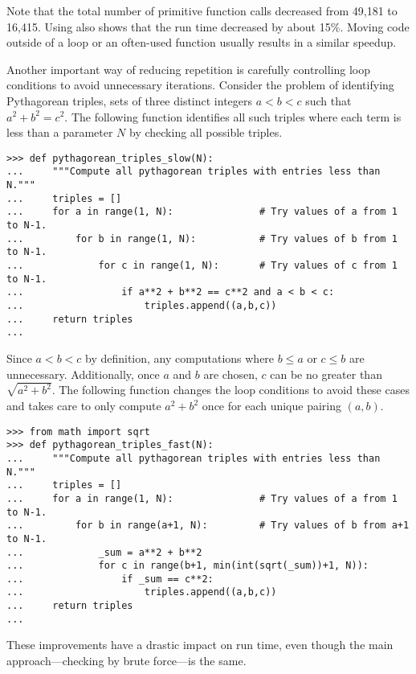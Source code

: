 Note that the total number of primitive function calls decreased from 49,181 to 16,415.
Using  also shows that the run time decreased by about 15\%.
Moving code outside of a loop or an often-used function usually results in a similar speedup.

Another important way of reducing repetition is carefully controlling loop conditions to avoid unnecessary iterations.
Consider the problem of identifying Pythagorean triples, sets of three distinct integers $a < b < c$ such that $a^2 + b^2 = c^2$.
The following function identifies all such triples where each term is less than a parameter $N$ by checking all possible triples.

\begin{lstlisting}
>>> def pythagorean_triples_slow(N):
...     """Compute all pythagorean triples with entries less than N."""
...     triples = []
...     for a in range(1, N):               # Try values of a from 1 to N-1.
...         for b in range(1, N):           # Try values of b from 1 to N-1.
...             for c in range(1, N):       # Try values of c from 1 to N-1.
...                 if a**2 + b**2 == c**2 and a < b < c:
...                     triples.append((a,b,c))
...     return triples
...
\end{lstlisting}

Since $a < b < c$ by definition, any computations where $b \le a$ or $c \le b$ are unnecessary.
Additionally, once $a$ and $b$ are chosen, $c$ can be no greater than $\sqrt{a^2 + b^2}$.
The following function changes the loop conditions to avoid these cases and takes care to only compute $a^2 + b^2$ once for each unique pairing $(a,b)$.

\begin{lstlisting}
>>> from math import sqrt
>>> def pythagorean_triples_fast(N):
...     """Compute all pythagorean triples with entries less than N."""
...     triples = []
...     for a in range(1, N):               # Try values of a from 1 to N-1.
...         for b in range(a+1, N):         # Try values of b from a+1 to N-1.
...             _sum = a**2 + b**2
...             for c in range(b+1, min(int(sqrt(_sum))+1, N)):
...                 if _sum == c**2:
...                     triples.append((a,b,c))
...     return triples
...
\end{lstlisting}

These improvements have a drastic impact on run time, even though the main approach---checking by brute force---is the same.

